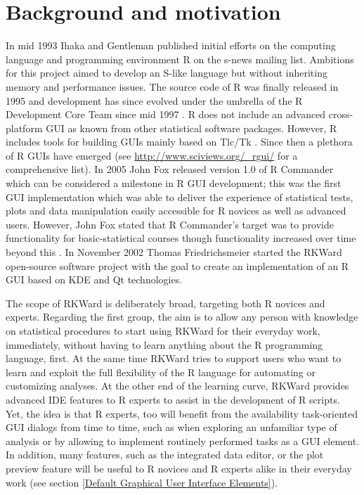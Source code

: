 \section[Background and motivation]{Background and motivation}
In mid 1993 Ihaka and Gentleman published initial efforts on the computing
language and programming environment R on the s-news mailing list. Ambitions for
this project aimed to develop an S-like language but without inheriting memory
and performance issues. The source code of R was finally released in 1995 and
development has since evolved under the umbrella of the R Development Core Team
since mid 1997 \citep{RDCT2001, RDCT2010, Ihaka_Gentlemen_1993}.
R does not include an advanced cross-platform GUI as known from other
statistical software packages. However, R includes tools for building GUIs
mainly based on Tlc/Tk \citep{Dalgaard2001, Dalgaard2002}. Since then a
plethora of R GUIs have emerged (see \url{http://www.sciviews.org/_rgui/} for a
comprehensive list). In 2005 John Fox released version 1.0 of R Commander which
can be considered a milestone in R GUI development; this was the first GUI
implementation which was able to deliver the experience of statistical tests,
plots and data manipulation easily accessible for R novices as well as advanced
users. However, John Fox stated that R Commander's target was to provide
functionality for basic-statistical courses though functionality increased over
time beyond this \citep{Fox2005}. In November 2002 Thomas Friedrichsmeier
started the RKWard open-source software project with the goal to create an
implementation of an R GUI based on KDE and Qt technologies.

The scope of RKWard is deliberately broad, targeting both R novices and experts.
Regarding the first group, the aim is to allow any person with knowledge on
statistical procedures to start using RKWard for their everyday work,
immediately, without having to learn anything about the R programming language,
first. At the same time RKWard tries to support users who want to learn and
exploit the full flexibility of the R language for automating or customizing
analyses. At the other end of the learning curve, RKWard provides advanced IDE
features to R experts to assist in the development of R scripts. Yet, the idea
is that R experts, too will benefit from the availability task-oriented GUI
dialogs from time to time, such as when exploring an unfamiliar type of analysis
or by allowing to implement routinely performed tasks as a GUI element. In
addition, many features, such as the integrated data editor, or the plot preview
feature will be useful to R novices and R experts alike in their everyday work
(see section \ref{Default Graphical User Interface Elements}).

